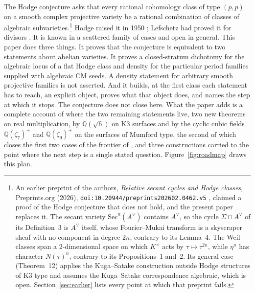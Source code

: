 \documentclass[11pt,reqno]{amsart}
\numberwithin{equation}{section}
\theoremstyle{plain}
\theoremstyle{definition}
\newcommand{\QQ}{\mathbb{Q}}
\begin{document}
The Hodge conjecture asks that every rational cohomology class of type $(p,p)$ on a smooth complex projective variety be a rational combination of classes of algebraic subvarieties.\footnote{An earlier preprint of the authors, \emph{Relative secant cycles and Hodge classes}, Preprints.org (2026), \nolinkurl{doi:10.20944/preprints202602.0462.v5} \cite{BB26}, claimed a proof of the Hodge conjecture that does not hold, and the present paper replaces it. The secant variety $\mathrm{Sec}^{n}(A^{\vee})$ contains $A^{\vee}$, so the cycle $\Sigma\cap A^{\vee}$ of its Definition~3 is $A^{\vee}$ itself, whose Fourier--Mukai transform is a skyscraper sheaf with no component in degree $2n$, contrary to its Lemma~4. The Weil classes span a $2$-dimensional space on which $K^{\times}$ acts by $\tau\mapsto\tau^{2n}$, while $\eta^{n}$ has character $N(\tau)^{n}$, contrary to its Propositions~1 and~2. Its general case (Theorem~12) applies the Kuga--Satake construction outside Hodge structures of K3 type and assumes the Kuga--Satake correspondence algebraic, which is open. Section~\ref{sec:earlier} lists every point at which that preprint fails.} Hodge raised it in 1950 \cite{Hod50}; Lefschetz had proved it for divisors \cite{Lef24}. It is known in a scattered family of cases and open in general. This paper does three things. It proves that the conjecture is equivalent to two statements about abelian varieties. It proves a closed-stratum dichotomy for the algebraic locus of a flat Hodge class and density for the particular period families supplied with algebraic CM seeds. A density statement for arbitrary smooth projective families is not asserted. And it builds, at the first class each statement has to reach, an explicit object, proves what that object does, and names the step at which it stops. The conjecture does not close here. What the paper adds is a complete account of where the two remaining statements live, two new theorems on real multiplication, by $\QQ(\sqrt6)$ on K3 surfaces and by the cyclic cubic fields $\QQ(\zeta_{7})^{+}$ and $\QQ(\zeta_{9})^{+}$ on the surfaces of Mumford type, the second of which closes the first two cases of the frontier of \cite{BMB26}, and three constructions carried to the point where the next step is a single stated question. Figure~\ref{fig:roadmap} draws this plan.
\end{document}
